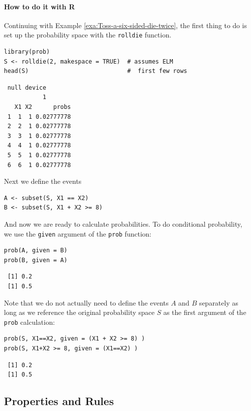 \documentclass[captions=tableheading]{scrbook}
\begin{document}
\paragraph*{How to do it with \textsf{R}}

Continuing with Example \ref{exa:Toss-a-six-sided-die-twice}, the first thing to do is set up the probability space with the \texttt{rolldie} function.


\begin{verbatim}
library(prob)
S <- rolldie(2, makespace = TRUE)  # assumes ELM
head(S)                            #  first few rows
\end{verbatim}

\begin{verbatim}
 null device 
           1
   X1 X2      probs
 1  1  1 0.02777778
 2  2  1 0.02777778
 3  3  1 0.02777778
 4  4  1 0.02777778
 5  5  1 0.02777778
 6  6  1 0.02777778
\end{verbatim}

Next we define the events


\begin{verbatim}
A <- subset(S, X1 == X2)
B <- subset(S, X1 + X2 >= 8)
\end{verbatim}

And now we are ready to calculate probabilities. To do conditional probability, we use the \texttt{given} argument of the \texttt{prob} function:


\begin{verbatim}
prob(A, given = B)
prob(B, given = A)
\end{verbatim}

\begin{verbatim}
 [1] 0.2
 [1] 0.5
\end{verbatim}

Note that we do not actually need to define the events \(A\) and \(B\) separately as long as we reference the original probability space \(S\) as the first argument of the \texttt{prob} calculation:


\begin{verbatim}
prob(S, X1==X2, given = (X1 + X2 >= 8) )
prob(S, X1+X2 >= 8, given = (X1==X2) )
\end{verbatim}

\begin{verbatim}
 [1] 0.2
 [1] 0.5
\end{verbatim}
\subsection{Properties and Rules}
\label{sec-3-6-1}
\end{document}
